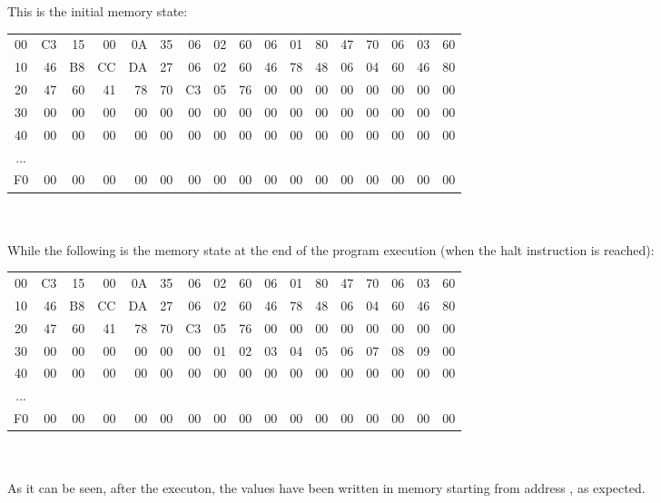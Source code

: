This is the initial memory state: \\

\noindent\begin{tabular}{ |c| r*{15}{@{ }r}| }
    
        00 & C3 & 15 & 00 & 0A & 35 & 06 & 02 & 60 & 06 & 01 & 80 & 47 & 70 & 06 & 03 & 60 \\ 
        10 & 46 & B8 & CC & DA & 27 & 06 & 02 & 60 & 46 & 78 & 48 & 06 & 04 & 60 & 46 & 80  \\
        20 & 47 & 60 & 41 & 78 & 70 & C3 & 05 & 76 & 00 & 00 & 00 & 00 & 00 & 00 & 00 & 00  \\
        30 & 00 & 00 & 00 & 00 & 00 & 00 & 00 & 00 & 00 & 00 & 00 & 00 & 00 & 00 & 00 & 00\\
        40 & 00 & 00 & 00 & 00 & 00 & 00 & 00 & 00 & 00 & 00 & 00 & 00 & 00 & 00 & 00 & 00\\
    ... \\
        F0 & 00 & 00 & 00 & 00 & 00 & 00 & 00 & 00 & 00 & 00 & 00 & 00 & 00 & 00 & 00 & 00\\
\end{tabular}
\\ \\

While the following is the memory state at the end of the program execution (when the halt  instruction is reached):
\\

\noindent\begin{tabular}{ |c| r*{15}{@{ }r}| }
    
    00 & C3 & 15 & 00 & 0A & 35 & 06 & 02 & 60 & 06 & 01 & 80 & 47 & 70 & 06 & 03 & 60 \\ 
    10 & 46 & B8 & CC & DA & 27 & 06 & 02 & 60 & 46 & 78 & 48 & 06 & 04 & 60 & 46 & 80  \\
    20 & 47 & 60 & 41 & 78 & 70 & C3 & 05 & 76 & 00 & 00 & 00 & 00 & 00 & 00 & 00 & 00  \\
    30 & 00 & 00 & 00 & 00 & 00 & 00 & 01 & 02 & 03 & 04 & 05 & 06 & 07 & 08 & 09 & 00\\
    40 & 00 & 00 & 00 & 00 & 00 & 00 & 00 & 00 & 00 & 00 & 00 & 00 & 00 & 00 & 00 & 00\\
... \\
    F0 & 00 & 00 & 00 & 00 & 00 & 00 & 00 & 00 & 00 & 00 & 00 & 00 & 00 & 00 & 00 & 00\\
\end{tabular}
\\
\\
As it can be seen, after the executon, the values  have been written in memory starting from address , as expected.
